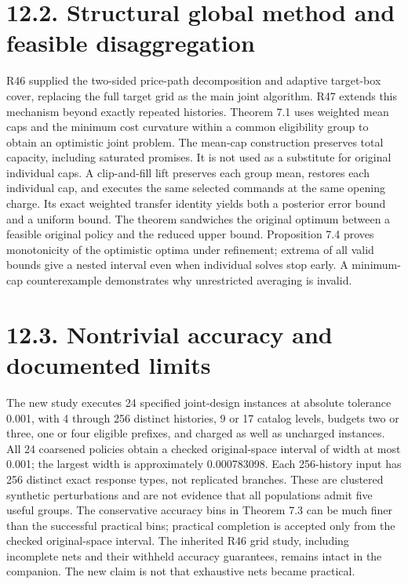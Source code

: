 \documentclass[11pt]{article}
\begin{document}
\section*{12.2. Structural global method and feasible disaggregation}
R46 supplied the two-sided price-path decomposition and adaptive target-box cover, replacing the full target grid as the main joint algorithm. R47 extends this mechanism beyond exactly repeated histories. Theorem 7.1 uses weighted mean caps and the minimum cost curvature within a common eligibility group to obtain an optimistic joint problem. The mean-cap construction preserves total capacity, including saturated promises. It is not used as a substitute for original individual caps. A clip-and-fill lift preserves each group mean, restores each individual cap, and executes the same selected commands at the same opening charge. Its exact weighted transfer identity yields both a posterior error bound and a uniform bound. The theorem sandwiches the original optimum between a feasible original policy and the reduced upper bound. Proposition 7.4 proves monotonicity of the optimistic optima under refinement; extrema of all valid bounds give a nested interval even when individual solves stop early. A minimum-cap counterexample demonstrates why unrestricted averaging is invalid.

\section*{12.3. Nontrivial accuracy and documented limits}
The new study executes 24 specified joint-design instances at absolute tolerance 0.001, with 4 through 256 distinct histories, 9 or 17 catalog levels, budgets two or three, one or four eligible prefixes, and charged as well as uncharged instances. All 24 coarsened policies obtain a checked original-space interval of width at most 0.001; the largest width is approximately 0.000783098. Each 256-history input has 256 distinct exact response types, not replicated branches. These are clustered synthetic perturbations and are not evidence that all populations admit five useful groups. The conservative accuracy bins in Theorem 7.3 can be much finer than the successful practical bins; practical completion is accepted only from the checked original-space interval. The inherited R46 grid study, including incomplete nets and their withheld accuracy guarantees, remains intact in the companion. The new claim is not that exhaustive nets became practical.
\end{document}
